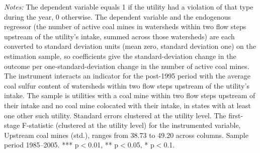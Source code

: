 \begin{table}[htbp]
\begin{minipage}{\linewidth}
\vspace{4pt}
\footnotesize
\raggedright
\textit{Notes:} The dependent variable equals 1 if the utility had a violation of that type during the year, 0 otherwise. The dependent variable and the endogenous regressor (the number of active coal mines in watersheds within two flow steps upstream of the utility's intake, summed across those watersheds) are each converted to standard deviation units (mean zero, standard deviation one) on the estimation sample, so coefficients give the standard-deviation change in the outcome per one-standard-deviation change in the number of active coal mines. The instrument interacts an indicator for the post-1995 period with the average coal sulfur content of watersheds within two flow steps upstream of the utility's intake. The sample is utilities with a coal mine within two flow steps upstream of their intake and no coal mine colocated with their intake, in states with at least one other such utility. Standard errors clustered at the utility level. The first-stage F-statistic (clustered at the utility level) for the instrumented variable, Upstream coal mines (std.), ranges from 38.73 to 49.20 across columns. Sample period 1985--2005. *** p$<$0.01, ** p$<$0.05, * p$<$0.1.
\end{minipage}
\end{table}
